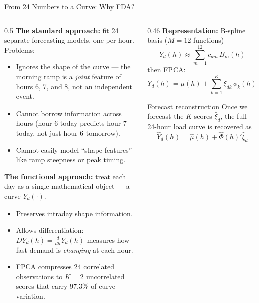 \documentclass[10pt,aspectratio=169]{beamer}
\begin{document}

\begin{frame}{From 24 Numbers to a Curve: Why FDA?}

  \begin{columns}
  \begin{column}{0.5\textwidth}
    \textbf{The standard approach:} fit 24 separate forecasting models,
    one per hour. Problems:
    \begin{itemize}
      \item Ignores the shape of the curve --- the morning ramp is a
        \emph{joint} feature of hours 6, 7, and 8, not an independent event.
      \item Cannot borrow information across hours (hour 6 today predicts
        hour 7 today, not just hour 6 tomorrow).
      \item Cannot easily model ``shape features'' like ramp steepness or
        peak timing.
    \end{itemize}

    \vspace{0.5em}
    \textbf{The functional approach:} treat each day as a single
    mathematical object --- a curve $Y_d(\cdot)$.
    \begin{itemize}
      \item Preserves intraday shape information.
      \item Allows differentiation: $DY_d(h) = \frac{d}{dh}Y_d(h)$
        measures how fast demand is \emph{changing} at each hour.
      \item FPCA compresses 24 correlated observations to $K=2$
        uncorrelated scores that carry 97.3\% of curve variation.
    \end{itemize}
  \end{column}
  \begin{column}{0.46\textwidth}
    \textbf{Representation:} B-spline basis ($M=12$ functions)
    \[
      Y_d(h) \approx \sum_{m=1}^{12} c_{dm}\, B_m(h)
    \]
    then FPCA:
    \[
      Y_d(h) = \mu(h) + \sum_{k=1}^{K} \xi_{dk}\,\phi_k(h) + \varepsilon_d(h)
    \]
    \begin{block}{Forecast reconstruction}
      Once we forecast the $K$ scores $\hat{\xi}_d$, the full
      24-hour load curve is recovered as
      \[
        \hat{Y}_d(h) = \hat\mu(h) + \hat\Phi(h)'\hat\xi_d
      \]
    \end{block}
  \end{column}
  \end{columns}
\end{frame}
\end{document}
